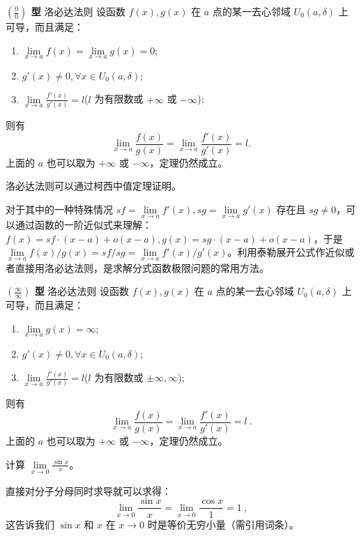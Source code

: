 
\begin{theorem}{\textbf{$\left(\frac{0}{0}\right)$ 型} 洛必达法则}
设函数 $f(x),g(x)$ 在 $a$ 点的某一去心邻域 $U_0(a,\delta)$ 上可导，而且满足：
\begin{enumerate}
\item $\lim\limits_{x\rightarrow a} f(x)=\lim\limits_{x\rightarrow a}g(x)=0$;
\item $g'(x)\neq 0,\forall x\in U_0(a,\delta)$;
\item $\lim\limits_{x\rightarrow a} \frac{f'(x)}{g'(x)}=l$($l$ 为有限数或 $+\infty$ 或 $-\infty$);
\end{enumerate}
则有
\begin{equation}
\lim\limits_{x\rightarrow a}\frac{f(x)}{g(x)}=\lim\limits_{x\rightarrow a}\frac{f'(x)}{g'(x)}=l.
\end{equation}
上面的 $a$ 也可以取为 $+\infty$ 或 $-\infty$，定理仍然成立。
\end{theorem}
洛必达法则可以通过柯西中值定理证明。

对于其中的一种特殊情况 $sf=\lim\limits_{x\rightarrow a}f'(x),sg=\lim\limits_{x\rightarrow a}g'(x)$ 存在且 $sg\neq 0$，可以通过函数的一阶近似式来理解：$f(x)=sf\cdot (x-a)+o(x-a),g(x)=sg\cdot (x-a)+o(x-a)$，于是 $\lim\limits_{x\rightarrow a}f(x)/g(x)=sf/sg=\lim\limits_{x\rightarrow a}f'(x)/g'(x)$。利用泰勒展开公式作近似或者直接用洛必达法则，是求解分式函数极限问题的常用方法。

\begin{theorem}{\textbf{$\left(\frac{\infty}{\infty}\right)$ 型} 洛必达法则}
设函数 $f(x),g(x)$ 在 $a$ 点的某一去心邻域 $U_0(a,\delta)$ 上可导，而且满足：
\begin{enumerate}
\item $\lim\limits_{x\rightarrow a} g(x)=\infty$;
\item $g'(x)\neq 0,\forall x\in U_0(a,\delta)$;
\item $\lim\limits_{x\rightarrow a} \frac{f'(x)}{g'(x)}=l$($l$ 为有限数或 $\pm\infty,\infty$);
\end{enumerate}
则有
\begin{equation}
\lim\limits_{x\rightarrow a}\frac{f(x)}{g(x)}=\lim\limits_{x\rightarrow a}\frac{f'(x)}{g'(x)}=l~.
\end{equation}
上面的 $a$ 也可以取为 $+\infty$ 或 $-\infty$，定理仍然成立。
\end{theorem}
\begin{exercise}{}
计算 $\lim\limits_{x\rightarrow 0}\frac{\sin x}{x}$。
\end{exercise}
直接对分子分母同时求导就可以求得：
\begin{equation}
    \lim\limits_{x\rightarrow 0}\frac{\sin x}{x}=\lim\limits_{x\rightarrow 0}\frac{\cos x}{1}=1~,
\end{equation}
这告诉我们 $\sin x$ 和 $x$ 在 $x\rightarrow 0$ 时是等价无穷小量（需引用词条）。

